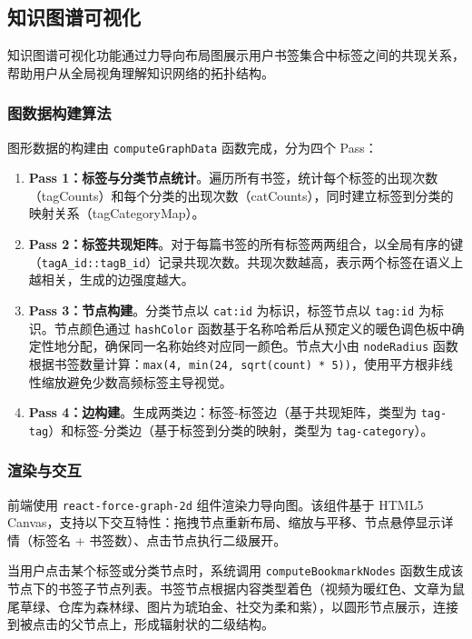 \documentclass[12pt,a4paper]{ctexart}
\begin{document}
\subsection{知识图谱可视化}

知识图谱可视化功能通过力导向布局图展示用户书签集合中标签之间的共现关系，帮助用户从全局视角理解知识网络的拓扑结构。

\subsubsection{图数据构建算法}

图形数据的构建由 \texttt{computeGraphData} 函数完成，分为四个 Pass：

\begin{enumerate}
  \item \textbf{Pass 1：标签与分类节点统计}。遍历所有书签，统计每个标签的出现次数（tagCounts）和每个分类的出现次数（catCounts），同时建立标签到分类的映射关系（tagCategoryMap）。
  \item \textbf{Pass 2：标签共现矩阵}。对于每篇书签的所有标签两两组合，以全局有序的键（\texttt{tagA\_id::tagB\_id}）记录共现次数。共现次数越高，表示两个标签在语义上越相关，生成的边强度越大。
  \item \textbf{Pass 3：节点构建}。分类节点以 \texttt{cat:id} 为标识，标签节点以 \texttt{tag:id} 为标识。节点颜色通过 \texttt{hashColor} 函数基于名称哈希后从预定义的暖色调色板中确定性地分配，确保同一名称始终对应同一颜色。节点大小由 \texttt{nodeRadius} 函数根据书签数量计算：\texttt{max(4, min(24, sqrt(count) * 5))}，使用平方根非线性缩放避免少数高频标签主导视觉。
  \item \textbf{Pass 4：边构建}。生成两类边：标签-标签边（基于共现矩阵，类型为 \texttt{tag-tag}）和标签-分类边（基于标签到分类的映射，类型为 \texttt{tag-category}）。
\end{enumerate}

\subsubsection{渲染与交互}

前端使用 \texttt{react-force-graph-2d} 组件渲染力导向图。该组件基于 HTML5 Canvas，支持以下交互特性：拖拽节点重新布局、缩放与平移、节点悬停显示详情（标签名 + 书签数）、点击节点执行二级展开。

当用户点击某个标签或分类节点时，系统调用 \texttt{computeBookmarkNodes} 函数生成该节点下的书签子节点列表。书签节点根据内容类型着色（视频为暖红色、文章为鼠尾草绿、仓库为森林绿、图片为琥珀金、社交为柔和紫），以圆形节点展示，连接到被点击的父节点上，形成辐射状的二级结构。
\end{document}
